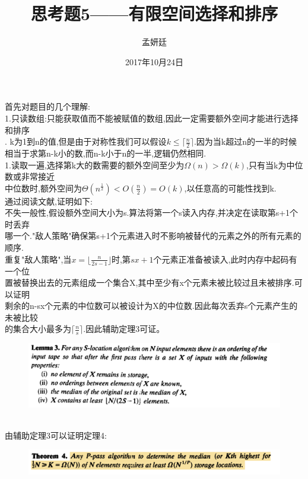 \documentclass[19pt,a4paper]{article}
\title{思考题5——有限空间选择和排序}
\author{孟妍廷\quad 2015202009}
\date{2017年10月24日}
\begin{document}
\maketitle

首先对题目的几个理解:\\
\indent 1.只读数组:只能获取值而不能被赋值的数组,因此一定需要额外空间才能进行选择和排序\\
. k为1到n的值,但是由于对称性我们可以假设$k\le\lceil\frac{n}{2}\rceil$.因为当k超过n的一半的时候\\
\indent 相当于求第n-k小的数,而n-k小于n的一半,逻辑仍然相同.\\
\indent 1.读取一遍,选择第k大的数需要的额外空间至少为$\Omega(n)>\Omega(k)$,只有当k为中位数或非常接近\\
\indent 中位数时,额外空间为$\Theta(n^{\frac{1}{2}})<O(\frac{n}{2})=O(k)$,以任意高的可能性找到k.\\
\indent 通过阅读文献,证明如下:\\
\indent 不失一般性,假设额外空间大小为s.算法将第一个s读入内存,并决定在读取第s+1个时丢弃\\
\indent 哪一个."敌人策略"确保第s+1个元素进入时不影响被替代的元素之外的所有元素的顺序.\\
\indent 重复"敌人策略",当$x=\lfloor\frac{n}{2s-1}\rfloor$时,第$sx+1$个元素正准备被读入,此时内存中起码有一个位\\
\indent  置被替换出去的元素组成一个集合X,其中至少有x个元素未被比较过且未被排序.可以证明\\
\indent 剩余的n-sx个元素的中位数可以被设计为X的中位数.因此每次丢弃s个元素产生的未被比较\\
\indent 的集合大小最多为$\lceil\frac{n}{s}\rceil$.因此辅助定理3可证。\\
\begin{figure}[htbp]
 \centering
 \includegraphics[scale=0.4]{1.png}
\end{figure}\\
\indent 由辅助定理3可以证明定理4:\\
\begin{figure}[htbp]
 \centering
 \includegraphics[scale=0.4]{2.png}
\end{figure}\\
\end{document}
